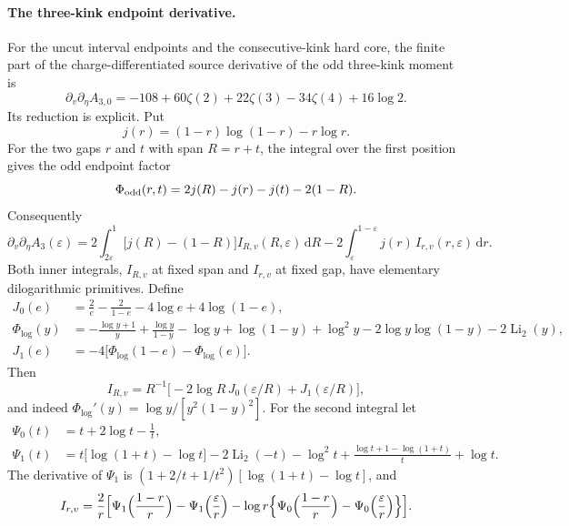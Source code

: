 \documentclass[11pt,a4paper]{article}
\numberwithin{equation}{section}
\newcommand{\dd}{\,\mathrm d}
\newcommand{\Li}{\operatorname{Li}}
\begin{document}
\paragraph{The three-kink endpoint derivative.} For the uncut interval endpoints and the consecutive-kink hard core,
the finite part of the charge-differentiated source derivative of the odd three-kink moment is
\begin{equation}
 \partial_v\partial_\eta A_{3,0}=-108+60\zeta(2)+22\zeta(3)-34\zeta(4)+16\log2.
 \label{eq:dualB:ep3}
\end{equation}
Its reduction is explicit. Put
\begin{equation}
 j(r)=(1-r)\log(1-r)-r\log r.
\end{equation}
For the two gaps $r$ and $t$ with span $R=r+t$, the integral over the first position gives the odd endpoint factor
\begin{equation}
 \Phi_{\rm odd}(r,t)=2j(R)-j(r)-j(t)-2(1-R).
\end{equation}
Consequently
\begin{equation}
 \partial_v\partial_\eta A_3(\varepsilon)=2\int_{2\varepsilon}^1\bigl[j(R)-(1-R)\bigr]I_{R,v}(R,\varepsilon)\dd R
 -2\int_\varepsilon^{1-\varepsilon}j(r)\,I_{r,v}(r,\varepsilon)\dd r.
 \label{eq:dualB:ep3reduce}
\end{equation}
Both inner integrals, $I_{R,v}$ at fixed span and $I_{r,v}$ at fixed gap, have elementary dilogarithmic primitives.
Define
\begin{equation}
\begin{aligned}
 J_0(e)&=\frac2e-\frac2{1-e}-4\log e+4\log(1-e),\\
 \Phi_{\log}(y)&=-\frac{\log y+1}{y}+\frac{\log y}{1-y}-\log y+\log(1-y)+\log^2y-2\log y\log(1-y)-2\Li_2(y),\\
 J_1(e)&=-4\bigl[\Phi_{\log}(1-e)-\Phi_{\log}(e)\bigr].
\end{aligned}
\end{equation}
Then
\begin{equation}
 I_{R,v}=R^{-1}\bigl[-2\log R\,J_0(\varepsilon/R)+J_1(\varepsilon/R)\bigr],
\end{equation}
and indeed $\Phi_{\log}'(y)=\log y/[y^2(1-y)^2]$. For the second integral let
\begin{equation}
\begin{aligned}
 \Psi_0(t)&=t+2\log t-\frac1t,\\
 \Psi_1(t)&=t\bigl[\log(1+t)-\log t\bigr]-2\Li_2(-t)-\log^2t+\frac{\log t+1-\log(1+t)}{t}+\log t.
\end{aligned}
\end{equation}
The derivative of $\Psi_1$ is $(1+2/t+1/t^2)[\log(1+t)-\log t]$, and
\begin{equation}
 I_{r,v}=\frac2r\Bigl[\Psi_1\Bigl(\frac{1-r}{r}\Bigr)-\Psi_1\Bigl(\frac\varepsilon r\Bigr)
 -\log r\Bigl\{\Psi_0\Bigl(\frac{1-r}{r}\Bigr)-\Psi_0\Bigl(\frac\varepsilon r\Bigr)\Bigr\}\Bigr].
\end{equation}
\end{document}

